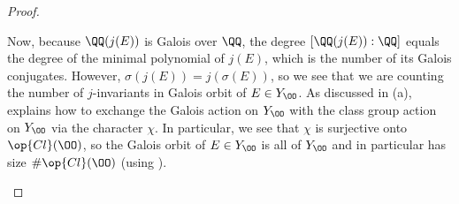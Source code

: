\documentclass[../notes.tex]{subfiles}
\begin{document}
\begin{proof}
\begin{listalph}
		Now, because $\QQ(j(E))$ is Galois over $\QQ$, the degree $[\QQ(j(E)):\QQ]$ equals the degree of the minimal polynomial of $j(E)$, which is the number of its Galois conjugates. However, $\sigma(j(E))=j(\sigma(E))$, so we see that we are counting the number of $j$-invariants in Galois orbit of $E\in Y_\OO$. As discussed in (a),  explains how to exchange the Galois action on $Y_\OO$ with the class group action on $Y_\OO$ via the character $\chi$. In particular, we see that $\chi$ is surjective onto $\op{Cl}(\OO)$, so the Galois orbit of $E\in Y_\OO$ is all of $Y_\OO$ and in particular has size $\#\op{Cl}(\OO)$ (using ).
		\qedhere
	\end{listalph}
\end{proof}
\end{document}

